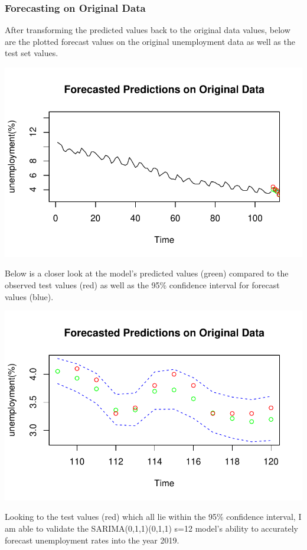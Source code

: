 \documentclass[
  letterpaper,
  DIV=11,
  numbers=noendperiod]{scrartcl}
\begin{document}
\hypertarget{forecasting-on-original-data}{%
\subsubsection{Forecasting on Original
Data}\label{forecasting-on-original-data}}

After transforming the predicted values back to the original data
values, below are the plotted forecast values on the original
unemployment data as well as the test set values.

\includegraphics{Final_Project_files/figure-pdf/unnamed-chunk-37-1.pdf}

Below is a closer look at the model's predicted values (green) compared
to the observed test values (red) as well as the 95\% confidence
interval for forecast values (blue).

\includegraphics{Final_Project_files/figure-pdf/unnamed-chunk-38-1.pdf}

Looking to the test values (red) which all lie within the 95\%
confidence interval, I am able to validate the SARIMA(0,1,1)(0,1,1) s=12
model's ability to accurately forecast unemployment rates into the year
2019.
\end{document}
